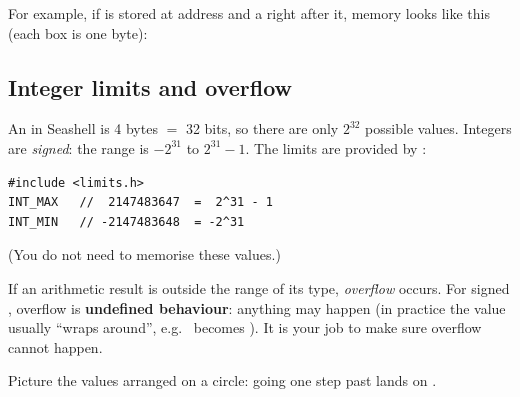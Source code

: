 For example, if  is stored at address  and a
 right after it, memory looks like this (each box is one byte):

\begin{center}
\end{center}

\subsection{Integer limits and overflow}

An  in Seashell is 4 bytes $=$ 32 bits, so there are only $2^{32}$ possible values.
Integers are \emph{signed}: the range is $-2^{31}$ to $2^{31}-1$. The limits are provided by
:
\begin{lstlisting}[style=c]
#include <limits.h>
INT_MAX   //  2147483647  =  2^31 - 1
INT_MIN   // -2147483648  = -2^31
\end{lstlisting}
(You do not need to memorise these values.)

\begin{important}[Overflow]
If an arithmetic result is outside the range of its type, \emph{overflow} occurs. For signed
, overflow is \textbf{undefined behaviour}: anything may happen (in practice the
value usually ``wraps around'', e.g.\  becomes ). It is your
job to make sure overflow cannot happen.
\end{important}

Picture the  values arranged on a circle: going one step past
 lands on .

